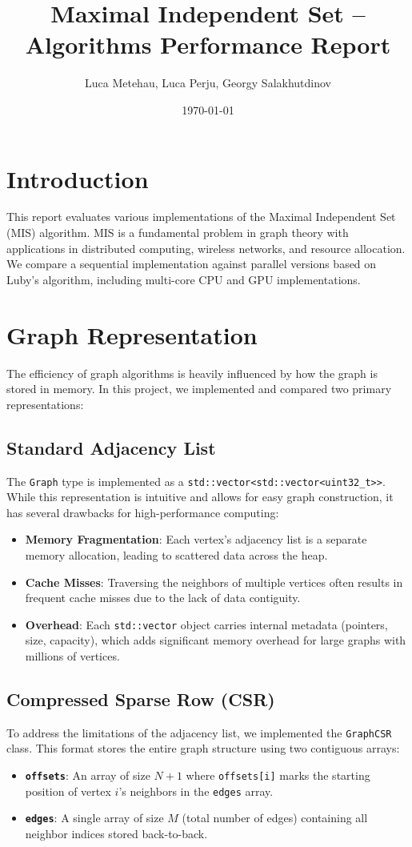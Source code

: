 \documentclass{article}
\title{Maximal Independent Set -- Algorithms Performance Report}
\author{Luca Metehau, Luca Perju, Georgy Salakhutdinov}
\date{\today}
\begin{document}
\maketitle

\section{Introduction}
This report evaluates various implementations of the Maximal Independent Set (MIS) algorithm. MIS is a fundamental problem in graph theory with applications in distributed computing, wireless networks, and resource allocation. We compare a sequential implementation against parallel versions based on Luby's algorithm, including multi-core CPU and GPU implementations.

\section{Graph Representation}
The efficiency of graph algorithms is heavily influenced by how the graph is stored in memory. In this project, we implemented and compared two primary representations:

\subsection{Standard Adjacency List}
The \texttt{Graph} type is implemented as a \texttt{std::vector<std::vector<uint32\_t>>}. While this representation is intuitive and allows for easy graph construction, it has several drawbacks for high-performance computing:
\begin{itemize}
    \item \textbf{Memory Fragmentation}: Each vertex's adjacency list is a separate memory allocation, leading to scattered data across the heap.
    \item \textbf{Cache Misses}: Traversing the neighbors of multiple vertices often results in frequent cache misses due to the lack of data contiguity.
    \item \textbf{Overhead}: Each \texttt{std::vector} object carries internal metadata (pointers, size, capacity), which adds significant memory overhead for large graphs with millions of vertices.
\end{itemize}

\subsection{Compressed Sparse Row (CSR)}
To address the limitations of the adjacency list, we implemented the \texttt{GraphCSR} class. This format stores the entire graph structure using two contiguous arrays:
\begin{itemize}
    \item \textbf{\texttt{offsets}}: An array of size $N+1$ where \texttt{offsets[i]} marks the starting position of vertex $i$'s neighbors in the \texttt{edges} array.
    \item \textbf{\texttt{edges}}: A single array of size $M$ (total number of edges) containing all neighbor indices stored back-to-back.
\end{itemize}
\end{document}
